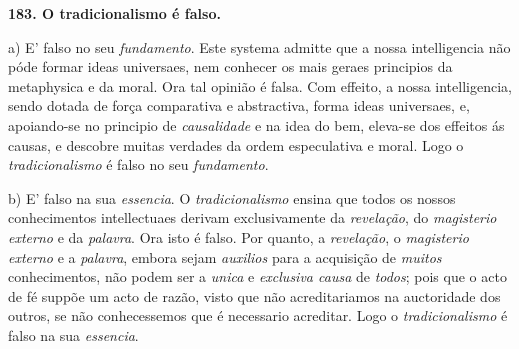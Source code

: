 \textbf{183. O tradicionalismo é falso.}

a) E' falso no seu \emph{fundamento}. Este systema admitte que a nossa intelligencia não póde formar ideas universaes, nem conhecer os mais geraes principios da metaphysica e da moral. Ora tal opinião é falsa. Com effeito, a nossa intelligencia, sendo dotada de força comparativa e abstractiva, forma ideas universaes, e, apoiando-se no principio de \emph{causalidade} e na idea do bem, eleva-se dos effeitos ás causas, e descobre muitas verdades da ordem especulativa e moral. Logo o \emph{tradicionalismo} é falso no seu \emph{fundamento}.

b) E' falso na sua \emph{essencia}. O \emph{tradicionalismo} ensina que   todos os nossos conhecimentos intellectuaes derivam exclusivamente da \emph{revelação}, do \emph{magisterio externo} e da \emph{palavra}. Ora isto é falso. Por quanto, a \emph{revelação}, o \emph{magisterio externo} e a \emph{palavra}, embora sejam \emph{auxilios} para a acquisição de \emph{muitos} conhecimentos, não podem ser a \emph{unica} e \emph{exclusiva causa} de \emph{todos}; pois que o acto de fé suppõe um acto de razão, visto que não acreditariamos na auctoridade dos outros, se não conhecessemos que é necessario acreditar. Logo o \emph{tradicionalismo} é falso na sua \emph{essencia}.

